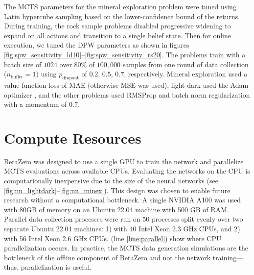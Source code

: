 The MCTS parameters for the mineral exploration problem were tuned using Latin hypercube sampling based on the lower-confidence bound of the returns.
During training, the rock sample problems disabled progressive widening to expand on all actions and transition to a single belief state.
Then for online execution, we tuned the DPW parameters as shown in figures \ref{fig:spw_sensitivity_ld10}--\ref{fig:spw_sensitivity_rs20}. %
The problems train with a batch size of $1024$ over $80\%$ of $100{,}000$ samples from one round of data collection (${n_\text{buffer}=1)}$ using $p_\text{dropout}$ of $0.2$, $0.5$, $0.7$, respectively.
Mineral exploration used a value function loss of MAE (otherwise MSE was used), light dark used the Adam optimizer \cite{kingma2014adam}, and the other problems used RMSProp \cite{hinton2014rmsprop} and batch norm regularization with a momentum of $0.7$.


\addtocounter{algorithm}{1}
\begin{figure*}[b!]
    \centering
    \begin{minipage}{0.8\textwidth}
        
    \end{minipage}
\end{figure*}

\begin{figure*}[b!]
    \centering
    \begin{minipage}{0.8\textwidth}
        
    \end{minipage}
\end{figure*}


\section*{Compute Resources}

BetaZero was designed to use a single GPU to train the network and parallelize MCTS evaluations across available CPUs.
Evaluating the networks on the CPU is computationally inexpensive due to the size of the neural networks (see \cref{fig:nn_lightdark}--\ref{fig:nn_minex}).
This design was chosen to enable future research without a computational bottleneck.
A single NVIDIA A100 was used with 80GB of memory on an Ubuntu 22.04 machine with 500 GB of RAM.
Parallel data collection processes were run on $50$ processes split evenly over two separate Ubuntu 22.04 machines: 1) with 40 Intel Xeon 2.3 GHz CPUs, and 2) with 56 Intel Xeon 2.6 GHz CPUs.
 (line \ref{line:parallel}) show where CPU parallelization occurs.
In practice, the MCTS data generation simulations are the bottleneck of the offline component of BetaZero and not the network training---thus, parallelization is useful.

